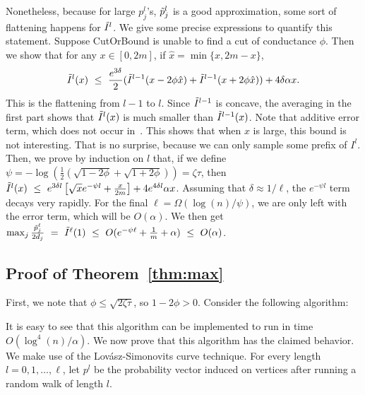 \documentclass[11pt]{article}
\newcommand\CutOrBound{{\sc CutOrBound}\xspace}
\begin{document}
Nonetheless, because for large $p^l_j$'s,
$\tilde{p}^l_j$ is a good approximation, some sort
of flattening happens for $\tilde{I}^l$. We give some
precise expressions to quantify this statement. Suppose
{\CutOrBound} is unable to find a cut of conductance $\phi$.
Then we show that for any $x \in [0, 2m]$, if $\hat{x} = \min\{x, 2m - x\}$,
$$\Itil^l(x)\ \leq\ \frac{e^{3\delta}}{2}(\Itil^{l-1}(x - 2\phi \hat{x}) + \Itil^{l-1}(x + 2\phi \hat{x})) + 4\delta\alpha x.$$
This is the flattening from $l-1$ to $l$. Since $\tilde{I}^{l-1}$ is concave, the
averaging in the first part shows that $\tilde{I}^l(x)$ is much smaller than
$\tilde{I}^{l-1}(x)$. Note that additive error term, which does not occur
in~\cite{LS90}. This shows that when $x$ is large, this bound is not
interesting. That is no surprise, because we can only sample some prefix of
$I^l$. Then, we prove by induction on $l$ that, if we define $\psi =
-\log(\frac{1}{2}(\sqrt{1-2\phi} + \sqrt{1+2\phi})) = \zeta\tau$, then
$\tilde{I}^l(x)\ \leq\ e^{3\delta l}\left[\sqrt{x}e^{-\psi l} + \frac{x}{2m}\right] + 4e^{4\delta l}\alpha x$.
Assuming that $\delta \approx 1/\ell$,  the $e^{-\psi l}$ term decays very
rapidly. For the final $\ell = \Omega(\log(n)/\psi)$, we are only left with the error term, which will be $O(\alpha)$. We then get
$\max_j \frac{\ptil^\ell_j}{2d_j}\ =\ \Itil^\ell(1)\ \leq\ O(e^{-\psi \ell} + \frac{1}{m} + \alpha)\ \leq\ O(\alpha)$.


\subsection{Proof of Theorem~\ref{thm:max}} \label{sec:ls}

First, we note that $\phi \leq \sqrt{2\zeta\tau}$, so $1 - 2\phi > 0$. Consider the following algorithm:


It is easy to see that this algorithm can be implemented to run in time $O(\log^4(n)/\alpha)$. We now prove that this algorithm has the claimed behavior. We make use of the Lov\'{a}sz-Simonovits curve technique. For every length $l = 0, 1, \ldots, \ell$, let $p^l$ be the probability vector induced on vertices after running a random walk of length $l$.
\end{document}
